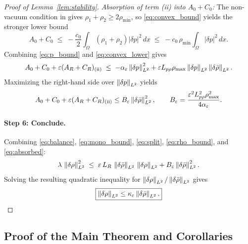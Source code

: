 \begin{proof}[Proof of Lemma~\ref{lem:stability}]
\textit{Absorption of term (ii) into $A_0 + C_0$:}
The non-vacuum condition in  gives $\rho_1 + \rho_2 \geq 2\rho_{\min}$,
so \eqref{eq:convex_bound} yields the stronger lower bound
\begin{equation}\label{eq:convex_lower}
  A_0 + C_0
  \;\leq\; -\frac{c_0}{2}\int_\Omega (\rho_1+\rho_2)|\delta p|^2\,dx
  \;\leq\; -c_0\,\rho_{\min}\int_\Omega |\delta p|^2\,dx.
\end{equation}
Combining \eqref{eq:p_bound} and \eqref{eq:convex_lower} gives
\begin{equation}\label{eq:absorbed}
  A_0 + C_0 + \varepsilon(A_R + C_R)_{\text{(ii)}}
  \;\leq\;
  -\alpha_\varepsilon \left\lVert \delta p \right\rVert_{L^2}^2
  + \varepsilon L_{p\rho}\rho_{\max}
    \left\lVert \delta p \right\rVert_{L^2}\left\lVert \delta\bar\rho \right\rVert_{L^2}.
\end{equation}
Maximizing the right-hand side over $\left\lVert \delta p \right\rVert_{L^2}$ yields
\[
  A_0 + C_0 + \varepsilon(A_R + C_R)_{\text{(ii)}}
  \leq B_\varepsilon\left\lVert \delta\bar\rho \right\rVert_{L^2}^2,
  \qquad
  B_\varepsilon=\frac{\varepsilon^2L_{p\rho}^2\rho_{\max}^2}{4\alpha_\varepsilon}.
\]

\paragraph{Step 6: Conclude.}
Combining \eqref{eq:balance}, \eqref{eq:mono_bound}, \eqref{eq:split},
\eqref{eq:rho_bound}, and \eqref{eq:absorbed}:
\[
  \lambda\,\left\lVert \delta\rho \right\rVert^2_{L^2}
  \;\leq\;
  \varepsilon\, L_R\,\left\lVert \delta\bar\rho \right\rVert_{L^2}\,\left\lVert \delta\rho \right\rVert_{L^2}
  + B_\varepsilon\left\lVert \delta\bar\rho \right\rVert_{L^2}^2.
\]
Solving the resulting quadratic inequality for
$\left\lVert \delta\rho \right\rVert_{L^2}/\left\lVert \delta\bar\rho \right\rVert_{L^2}$ gives
\begin{equation}\label{eq:final_stab}
  \boxed{\left\lVert \delta\rho \right\rVert_{L^2}
  \leq \kappa_\varepsilon\left\lVert \delta\bar\rho \right\rVert_{L^2}.}
\end{equation}
\end{proof}

\subsection{Proof of the Main Theorem and Corollaries}

